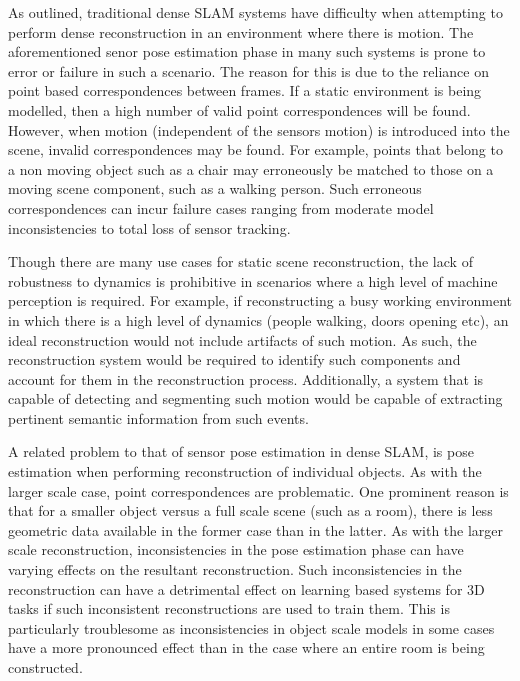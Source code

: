 As outlined, traditional dense SLAM systems have difficulty when attempting to perform dense reconstruction 
in an environment where there is motion. The aforementioned senor pose estimation phase in many such systems
is prone to error or failure in such a scenario. The reason for this is due to the reliance on point based 
correspondences between frames. If a static environment is being modelled, then a high number of valid point 
correspondences will be found. However, when motion (independent of the sensors motion) is introduced into 
the scene, invalid correspondences may be found. For example, points that belong to a non moving object 
such as a chair may erroneously be matched to those on a moving scene component, such as a walking person.
Such erroneous correspondences can incur failure cases ranging from moderate model inconsistencies to total 
loss of sensor tracking.

Though there are many use cases for static scene reconstruction, the lack of robustness to dynamics is 
prohibitive in scenarios where a high level of machine perception is required. For example, if 
reconstructing a busy working environment in which there is a high level of dynamics (people walking, 
doors opening etc), an ideal reconstruction would not include artifacts of such motion. As such, the 
reconstruction system would be required to identify such components and account for them in the 
reconstruction process. Additionally, a system that is capable of detecting and segmenting such motion 
would be capable of extracting pertinent semantic information from such events.

A related problem to that of sensor pose estimation in dense SLAM, is pose estimation when performing 
reconstruction of individual objects. As with the larger scale case, point correspondences are problematic.
One prominent reason is that for a smaller object versus a full scale scene (such as a room), there is less 
geometric data available in the former case than in the latter. As with the larger scale reconstruction, 
inconsistencies in the pose estimation phase can have varying effects on the resultant reconstruction.
Such inconsistencies in the reconstruction can have a detrimental effect on learning based systems for 3D 
tasks if such inconsistent reconstructions are used to train them. This is particularly troublesome as 
inconsistencies in object scale models in some cases have a more pronounced effect than in the case where 
an entire room is being constructed.

